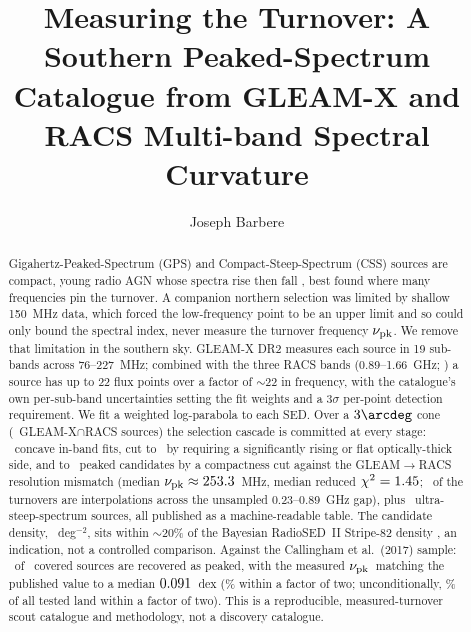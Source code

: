 \documentclass[twocolumn]{aastex631}
\newcommand{\nupk}{\ensuremath{\nu_{\rm pk}}}
\begin{document}
\title{Measuring the Turnover: A Southern Peaked-Spectrum Catalogue from GLEAM-X and RACS
Multi-band Spectral Curvature}

\author[0009-0008-3289-4447]{Joseph Barbere}

\begin{abstract}
Gigahertz-Peaked-Spectrum (GPS) and Compact-Steep-Spectrum (CSS) sources are compact, young radio AGN
whose spectra rise then fall \citep{odea1998,odea2021}, best found where many frequencies pin the
turnover. A companion northern selection was limited by shallow 150~MHz data, which forced the
low-frequency point to be an upper limit and so could only bound the spectral index, never measure the
turnover frequency \nupk. We remove that limitation in the southern sky. GLEAM-X DR2 \citep{rossdr2}
measures each source in 19 sub-bands across 76--227~MHz; combined with the three RACS bands (0.89--1.66~GHz;
\citealt{racs2020,racshale2021,racsmid2024,racshigh2025}) a source has up to 22 flux points over
a factor of $\sim$22 in frequency, with the catalogue's own per-sub-band uncertainties setting
the fit weights and a $3\sigma$ per-point detection requirement. We fit a weighted log-parabola
to each SED. Over a $3\arcdeg$ cone (\soRealNmatched\ GLEAM-X$\cap$RACS sources) the selection
cascade is committed at every stage: \soRealNpeakedNaive\ concave in-band fits, cut to
\soRealNpeakedRising\ by requiring a significantly rising or flat optically-thick side, and to
\soRealNpeaked\ peaked candidates by a compactness cut against the GLEAM$\to$RACS resolution
mismatch (median $\nupk\approx\soRealMedianNupk$~MHz, median reduced
$\chi^2=1.45$; \soRealGapFrac\ of the turnovers are interpolations across the
unsampled 0.23--0.89~GHz gap), plus \soRealNuss\ ultra-steep-spectrum sources, all published as
a machine-readable table. The candidate density, \soRealDensity~deg$^{-2}$, sits within
$\sim$20\% of the Bayesian RadioSED~II Stripe-82 density \citep{kerrison2025}, an indication,
not a controlled comparison. Against the Callingham et al.\ (2017) sample:
\soRealCallRecovered\ of \soRealCallTried\ covered sources are recovered as peaked, with the
measured \nupk\ matching the published value to a median $0.091$~dex
(\soRealCallWithin\% within a factor of two; unconditionally,
\soRealCallWithinTwoOfTested\% of all tested land within a factor of two). This is a
reproducible, measured-turnover scout catalogue and methodology, not a discovery catalogue.
\end{abstract}
\end{document}
